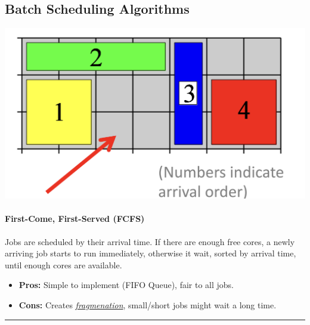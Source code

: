 \documentclass[openany,12pt]{book}
\begin{document}
\subsection*{Batch Scheduling Algorithms}
\begin{center}
    \begin{minipage}{0.30\textwidth}
        \vspace{0pt} %
        \centering
        \includegraphics[width=\linewidth]{FCFS.png}
    \end{minipage}\hfill
    \begin{minipage}{0.65\textwidth}
        \vspace{0pt} %
        \paragraph{First-Come, First-Served (FCFS)} Jobs are scheduled by their arrival time. If there are enough free cores, a newly arriving job starts to run immediately, otherwise it wait, sorted by arrival time, until enough cores are available.
        \begin{itemize}
            \item \textbf{Pros:} Simple to implement (FIFO Queue), fair to all jobs.
            \item \textbf{Cons:} Creates \textit{\ul{fragmenation}}, small/short jobs might wait a long time.
        \end{itemize}
    \end{minipage}
\end{center}

\noindent\rule{\linewidth}{0.4pt}
\end{document}
